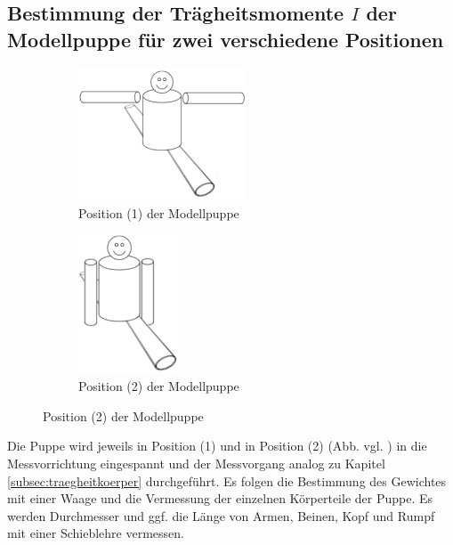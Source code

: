 \subsection{Bestimmung der Trägheitsmomente $I$ der Modellpuppe für zwei verschiedene Positionen}
\begin{figure}[h]
	\centering
	\label{fig:puppe}
	\begin{subfigure}{0.48\textwidth}
		\label{fig:puppe1}
		\centering
		\includegraphics[width=5cm]{Bilder/puppe1.pdf}
		\caption{Position (1) der Modellpuppe}
	\end{subfigure}
	\begin{subfigure}{0.48\textwidth}
		\label{fig:puppe2}
		\centering
		\includegraphics[width=3cm]{Bilder/puppe2.pdf}
		\caption{Position (2) der Modellpuppe}
	\end{subfigure}
\end{figure}
\noindent Die Puppe wird jeweils in Position (1) und in Position (2) (Abb. vgl. \cite{V101}) in die Messvorrichtung eingespannt und 
der Messvorgang analog zu Kapitel \ref{subsec:traegheitkoerper} durchgeführt. 
Es folgen die Bestimmung des Gewichtes mit einer Waage und die Vermessung der einzelnen Körperteile der Puppe. 
Es werden Durchmesser und ggf. die Länge von Armen, Beinen, Kopf und Rumpf mit einer Schieblehre vermessen.

